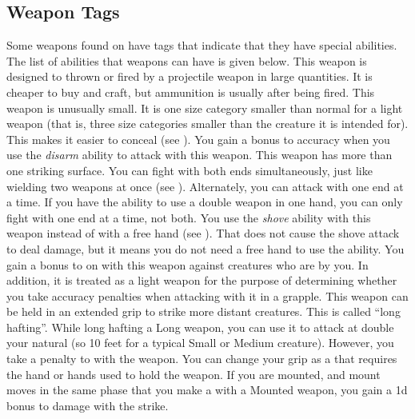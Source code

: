     \subsection{Weapon Tags}\label{Weapon Tags}
        Some weapons found on  have tags that indicate that they have special abilities. The list of abilities that weapons can have is given below.
         This weapon is designed to thrown or fired by a projectile weapon in large quantities. It is cheaper to buy and craft, but ammunition is usually  after being fired.
         This weapon is unusually small. It is one size category smaller than normal for a light weapon (that is, three size categories smaller than the creature it is intended for). This makes it easier to conceal (see ).
         You gain a  bonus to accuracy when you use the \textit{disarm} ability to attack with this weapon.
         This weapon has more than one striking surface. You can fight with both ends simultaneously, just like wielding two weapons at once (see ). Alternately, you can attack with one end at a time. If you have the ability to use a double weapon in one hand, you can only fight with one end at a time, not both.
         You use the \textit{shove} ability with this weapon instead of with a free hand (see ).
        That does not cause the shove attack to deal damage, but it means you do not need a free hand to use the ability.
         You gain a  bonus to  on  with this weapon against creatures who are  by you.
        In addition, it is treated as a light weapon for the purpose of determining whether you take accuracy penalties when attacking with it in a grapple.
         This weapon can be held in an extended grip to strike more distant creatures.
        This is called ``long hafting''.
        While long hafting a Long weapon, you can use it to attack at double your natural  (so 10 feet for a typical Small or Medium creature).
        However, you take a  penalty to  with the weapon.
        You can change your grip as a  that requires the hand or hands used to hold the weapon.
        \label{Mounted Weapon} If you are mounted, and mount moves in the same phase that you make a  with a Mounted weapon, you gain a \plus1d bonus to damage with the strike.
